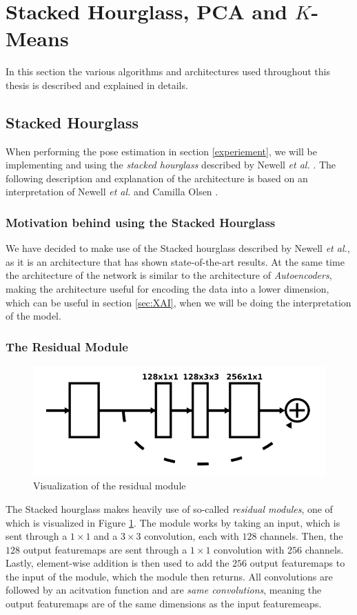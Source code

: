 \documentclass[./main.tex]{subfiles}
\begin{document}
\section{Stacked Hourglass, PCA and $K$-Means}
In this section the various algorithms and architectures used throughout this thesis is described and explained in details.
\subsection{Stacked Hourglass}
When performing the pose estimation in section \ref{experiement}, we will be implementing and using the \textit{stacked hourglass} described by Newell \textit{et al.} \cite{Newell}. The following description and explanation of the architecture is based on an interpretation of Newell \textit{et al.} \cite{Newell} and Camilla Olsen \cite{Camilla}.

\subsubsection{Motivation behind using the Stacked Hourglass}\label{subsec:reasoning}
We have decided to make use of the Stacked hourglass described by Newell \textit{et al.}, as it is an architecture that has shown state-of-the-art results. At the same time the architecture of the network is similar to the architecture of \textit{Autoencoders}, making the architecture useful for encoding the data into a lower dimension, which can be useful in section \ref{sec:XAI}, when we will be doing the interpretation of the model.

\subsubsection{The Residual Module}
\begin{figure}[htbp]
    \centering
    \includegraphics[height = 2 cm]{entities/Residual.png}
    \caption{Visualization of the residual module \cite{Newell}}
    \label{fig:residual}
\end{figure}
\noindent The Stacked hourglass makes heavily use of so-called \textit{residual modules}, one of which is visualized in Figure \ref{fig:residual}. The module works by taking an input, which is sent through a $1 \times 1$ and a $3 \times 3$ convolution, each with $128$ channels. Then, the $128$ output featuremaps are sent through a $1 \times 1$ convolution with $256$ channels. Lastly, element-wise addition is then used to add the $256$ output featuremaps to the input of the module, which the module then returns. All convolutions are followed by an acitvation function and are \textit{same convolutions}, meaning the output featuremaps are of the same dimensions as the input featuremeaps.
\end{document}
